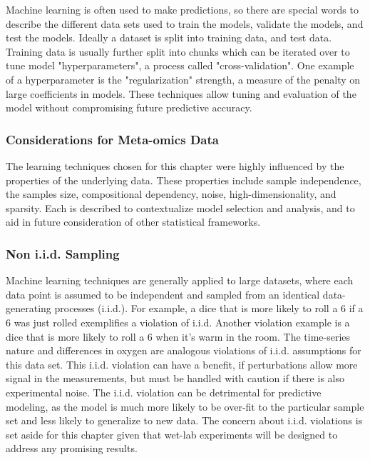 Machine learning is often used to make predictions, so there are special words to describe the different data sets used to train the models, validate the models, and test the models.
Ideally a dataset is split into training data, and test data.
Training data is usually further split into chunks which can be iterated over to tune model "hyperparameters", a process called "cross-validation". %
One example of a hyperparameter is the "regularization" strength, a measure of the penalty on large coefficients in models. %
These techniques allow tuning and evaluation of the model without compromising future predictive accuracy.

\subsubsection{Considerations for Meta-omics Data}

The learning techniques chosen for this chapter were highly influenced by the properties of the underlying data.
These properties include sample independence, the samples size, compositional dependency, noise, high-dimensionality, and sparsity.
Each is described to contextualize model selection and analysis, and to aid in future consideration of other statistical frameworks.

\subsubsection{Non i.i.d. Sampling}
Machine learning techniques are generally applied to large datasets, where each data point is assumed to be independent and sampled from an identical data-generating processes (i.i.d.).
For example, a dice that is more likely to roll a 6 if a 6 was just rolled exemplifies a violation of i.i.d.
Another violation example is a dice that is more likely to roll a 6 when it's warm in the room.
The time-series nature and differences in oxygen are analogous violations of i.i.d. assumptions for this data set.
This i.i.d. violation can have a benefit, if perturbations allow more signal in the measurements, but must be handled with caution if there is also experimental noise.
The i.i.d. violation can be detrimental for predictive modeling, as the model is much more likely to be over-fit to the particular sample set and less likely to generalize to new data.
The concern about  i.i.d. violations is set aside for this chapter given that wet-lab experiments will be designed to address any promising results.

